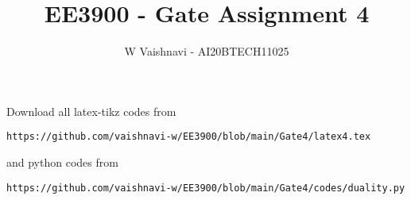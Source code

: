 \documentclass[journal,12pt,twocolumn]{IEEEtran}
\DeclareMathOperator*{\Res}{Res}
\begin{document}
\newcommand{\BEQA}{\begin{eqnarray}}
\newcommand{\EEQA}{\end{eqnarray}}
\newcommand{\define}{\stackrel{\triangle}{=}}

\raggedbottom
\setlength{\parindent}{0pt}
\providecommand{\mbf}{\mathbf}
\providecommand{\pr}[1]{\ensuremath{\Pr\left(#1\right)}}
\providecommand{\qfunc}[1]{\ensuremath{Q\left(#1\right)}}
\providecommand{\sbrak}[1]{\ensuremath{{}\left[#1\right]}}
\providecommand{\lsbrak}[1]{\ensuremath{{}\left[#1\right.}}
\providecommand{\rsbrak}[1]{\ensuremath{{}\left.#1\right]}}
\providecommand{\brak}[1]{\ensuremath{\left(#1\right)}}
\providecommand{\lbrak}[1]{\ensuremath{\left(#1\right.}}
\providecommand{\rbrak}[1]{\ensuremath{\left.#1\right)}}
\providecommand{\cbrak}[1]{\ensuremath{\left\{#1\right\}}}
\providecommand{\lcbrak}[1]{\ensuremath{\left\{#1\right.}}
\providecommand{\rcbrak}[1]{\ensuremath{\left.#1\right\}}}
\theoremstyle{remark}
\newtheorem{rem}{Remark}
\newtheorem*{remark}{Remark}
\newcommand{\sgn}{\mathop{\mathrm{sgn}}}
\providecommand{\abs}[1]{\vert#1\vert}
\providecommand{\res}[1]{\Res\displaylimits_{#1}} 
\providecommand{\norm}[1]{\lVert#1\rVert}
\providecommand{\mtx}[1]{\mathbf{#1}}
\providecommand{\mean}[1]{E[ #1 ]}
\providecommand{\sinc}{sinc}
\providecommand{\fourier}{\overset{\mathcal{F}}{ \rightleftharpoons}}
\providecommand{\system}{\overset{\mathcal{H}}{ \longleftrightarrow}}
\newcommand{\solution}{\noindent \textbf{Solution: }}
\newcommand{\cosec}{\,\text{cosec}\,}
\providecommand{\dec}[2]{\ensuremath{\overset{#1}{\underset{#2}{\gtrless}}}}
\newcommand{\myvec}[1]{\ensuremath{\begin{pmatrix}#1\end{pmatrix}}}
\newcommand{\mydet}[1]{\ensuremath{\begin{vmatrix}#1\end{vmatrix}}}
\makeatletter
{}
\makeatother
\let\StandardTheFigure\thefigure
\let\vec\mathbf
\renewcommand{\thefigure}{\theproblem}
\def\putbox#1#2#3{\makebox[0in][l]{\makebox[#1][l]{}\raisebox{\baselineskip}[0in][0in]{\raisebox{#2}[0in][0in]{#3}}}}
     \def\rightbox#1{\makebox[0in][r]{#1}}
     \def\centbox#1{\makebox[0in]{#1}}
     \def\topbox#1{\raisebox{-\baselineskip}[0in][0in]{#1}}
     \def\midbox#1{\raisebox{-0.5\baselineskip}[0in][0in]{#1}}
\vspace{3cm}
\title{EE3900 - Gate Assignment 4}
\author{W Vaishnavi - AI20BTECH11025}
\maketitle
\newpage
\bigskip
\renewcommand{\thefigure}{\theenumi}
\renewcommand{\thetable}{\theenumi}
Download all latex-tikz codes from 
%
\begin{lstlisting}
https://github.com/vaishnavi-w/EE3900/blob/main/Gate4/latex4.tex
\end{lstlisting}
and python codes from 
%
\begin{lstlisting}  
https://github.com/vaishnavi-w/EE3900/blob/main/Gate4/codes/duality.py
\end{lstlisting}
\end{document}

